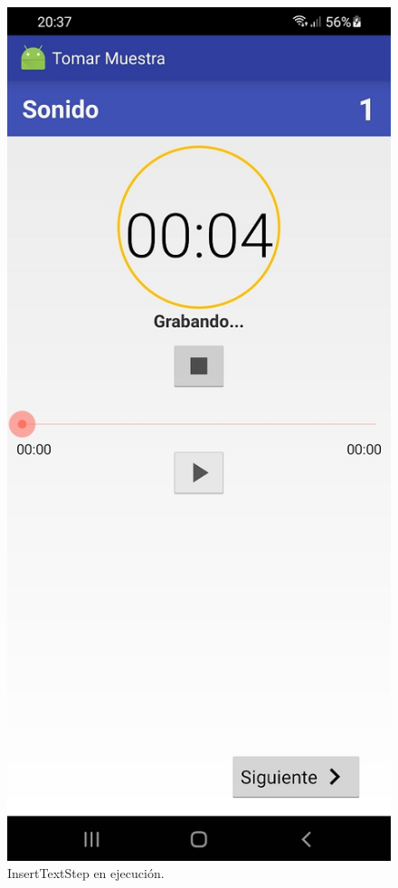 \begin{figure}[H]
  \centering
    \includegraphics[scale=0.3]{50-anexos/C-steps/sound_screen.jpg} 
    \caption{InsertTextStep en ejecución.}
\end{figure}




